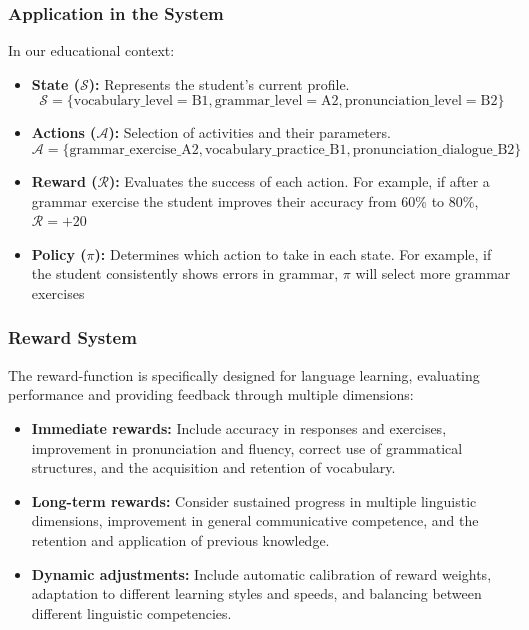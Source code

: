 \subsubsection{Application in the System}

In our educational context:

\begin{itemize}
  \item \textbf{State ($\mathcal{S}$):} Represents the student's current profile.
        \begin{equation}\label{eq:state}
          \mathcal{S} = \{\text{vocabulary\_level} = \text{B1}, \text{grammar\_level} = \text{A2}, \text{pronunciation\_level} = \text{B2}\}
        \end{equation}

  \item \textbf{Actions ($\mathcal{A}$):} Selection of activities and their parameters.
        \begin{equation}\label{eq:actions}
          \mathcal{A} = \{\text{grammar\_exercise\_A2}, \text{vocabulary\_practice\_B1}, \text{pronunciation\_dialogue\_B2}\}
        \end{equation}

  \item \textbf{Reward ($\mathcal{R}$):} Evaluates the success of each action. For example, if after a grammar exercise the student improves their accuracy from 60\% to 80\%, $\mathcal{R} = +20$

  \item \textbf{Policy ($\pi$):} Determines which action to take in each state. For example, if the student consistently shows errors in grammar, $\pi$ will select more grammar exercises
\end{itemize}

\subsubsection{Reward System}

The \gls{reward-function} is specifically designed for language learning, evaluating performance and providing feedback through multiple dimensions:

\begin{itemize}
  \item \textbf{Immediate rewards:} Include accuracy in responses and exercises, improvement in pronunciation and fluency, correct use of grammatical structures, and the acquisition and retention of vocabulary.

  \item \textbf{Long-term rewards:} Consider sustained progress in multiple linguistic dimensions, improvement in general communicative competence, and the retention and application of previous knowledge.

  \item \textbf{Dynamic adjustments:} Include automatic calibration of reward weights, adaptation to different learning styles and speeds, and balancing between different linguistic competencies.
\end{itemize}


